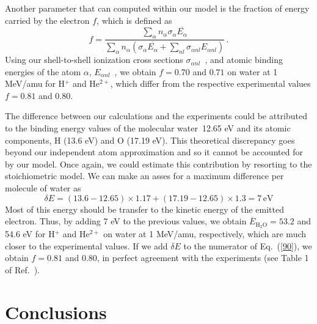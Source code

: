 \documentclass[preprint,12pt]{article}
\begin{document}
Another parameter that can computed within our model is the fraction of
energy carried by the electron $f$, which is defined as
\begin{equation}
f=\frac{\sum\limits_{\alpha}n_{\alpha}\sigma_{\alpha}
\overline{E_{\alpha}}}{\sum\limits_{\alpha}n_{\alpha}(\sigma_{\alpha}
\overline{E_{\alpha}}+\sum\limits_{nl}\sigma_{\alpha nl}E_{\alpha nl})}\,.
\label{90}
\end{equation}
Using our shell-to-shell ionization cross sections 
$\sigma_{\alpha nl}$~\cite{miraglia2019}, and atomic binding energies of 
the atom $\alpha$, $E_{\alpha nl}$~\cite{clementi}, we obtain 
$f=0.70$ and $0.71$ on water at 1 MeV/amu for H$^{+}$ and He$^{2+}$, 
which differ from the respective experimental values $f=0.81$ and $0.80$.

The difference between our calculations and the experiments could be 
attributed to the binding energy values of the molecular water~12.65 eV 
and its atomic components, H (13.6 eV) and O (17.19 eV). This theoretical
discrepancy goes beyond our independent atom approximation and so it 
cannot be accounted for by our model. Once again, we could estimate this 
contribution by resorting to the stoichiometric model. We can make an 
asses for a maximum difference per molecule of water as
\begin{equation}
\delta E=(13.6-12.65)\times1.17+(17.19-12.65)\times1.3=7\,\text{eV}  
\label{80}
\end{equation}
Most of this energy should be transfer to the kinetic energy of the 
emitted electron. Thus, by adding 7 eV to the previous values, we obtain
$\overline{E}_{\text{H}_2\text{O}}=53.2$ and 54.6 eV for H$^{+}$ and 
He$^{2+}$ on water at 1 MeV/amu, respectively, which are much closer to
the experimental values. If we add $\delta E$ to the numerator of 
Eq.~(\ref{90}), we obtain $f=0.81$ and $0.80$, in perfect agreement with 
the experiments (see Table 1 of Ref.~\cite{pimblott2007}).

\section{Conclusions}
\end{document}
